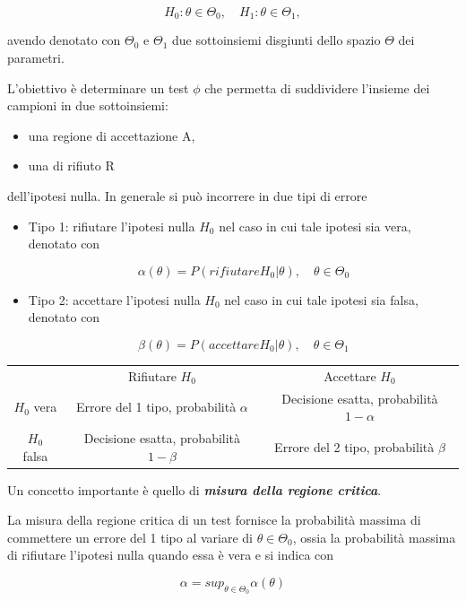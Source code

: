 \[H_0:\theta \in \Theta_0, \quad H_1: \theta \in \Theta_1,\]

avendo denotato con $\Theta_0$ e $\Theta_1$ due sottoinsiemi disgiunti dello spazio $\Theta$ dei parametri.

L'obiettivo è determinare un test $\phi$ che permetta di suddividere l'insieme dei campioni in due sottoinsiemi:

\begin{itemize}
    \item una regione di accettazione A,
    \item una di rifiuto R
\end{itemize}

dell'ipotesi nulla.
In generale si può incorrere in due tipi di errore

\begin{itemize}
    \item Tipo 1: rifiutare l'ipotesi nulla $H_0$ nel caso in cui tale ipotesi sia vera, denotato con 

    \[\alpha(\theta) = P(rifiutare H_0 | \theta), \quad \theta \in \Theta_0\]

    \item Tipo 2: accettare l'ipotesi nulla $H_0$ nel caso in cui tale ipotesi sia falsa, denotato con 

    \[\beta(\theta) = P(accettare H_0|\theta), \quad \theta \in \Theta_1\]
\end{itemize}

\vspace{5mm}
\begin{tabular}{c|c|c}
 & Rifiutare $H_0$ & Accettare $H_0$ \\
 $H_0$ vera & Errore del 1 tipo, probabilità $\alpha$ & Decisione esatta, probabilità $1-\alpha$ \\
 $H_0$ falsa & Decisione esatta, probabilità $1-\beta$ & Errore del 2 tipo, probabilità $\beta$
\end{tabular}
\vspace{5mm}

Un concetto importante è quello di \textbf{\textit{misura della regione critica}}.

La misura della regione critica di un test fornisce la probabilità massima di commettere un errore del 1 tipo al variare di $\theta \in \Theta_0$, ossia la probabilità massima di rifiutare l'ipotesi nulla quando essa è vera e si indica con

\[\alpha = sup_{\theta \in \Theta_0} \alpha(\theta)\]

